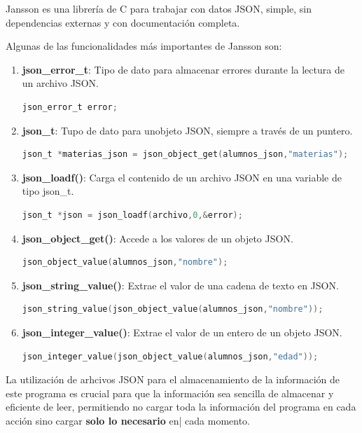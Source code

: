 Jansson es una librería de C para trabajar con datos JSON, simple, sin dependencias externas y con documentación completa.

Algunas de las funcionalidades más importantes de Jansson son:
\begin{enumerate}
    \item \textbf{json\_error\_t}: Tipo de dato para almacenar errores durante la lectura de un archivo JSON.
    \begin{lstlisting}[language=C, caption={json\_error\_t}]
        json_error_t error;
    \end{lstlisting}
    \item \textbf{json\_t}: Tupo de dato para unobjeto JSON, siempre a través de un puntero.
    \begin{lstlisting}[language=C, caption={json\_t}]
        json_t *materias_json = json_object_get(alumnos_json,"materias");
    \end{lstlisting}
    \item \textbf{json\_loadf()}: Carga el contenido de un archivo JSON en una variable de tipo json\_t.
    \begin{lstlisting}[language=C, caption={json\_loadf}]
        json_t *json = json_loadf(archivo,0,&error);
    \end{lstlisting}
    \item \textbf{json\_object\_get()}: Accede a los valores de un objeto JSON.
    \begin{lstlisting}[language=C, caption={json\_object\_get}]
        json_object_value(alumnos_json,"nombre");
    \end{lstlisting}
    \item \textbf{json\_string\_value()}: Extrae el valor de una cadena de texto en JSON.
    \begin{lstlisting}[language=C, caption={json\_string\_value}]
        json_string_value(json_object_value(alumnos_json,"nombre"));
    \end{lstlisting}
    \newpage
    \item \textbf{json\_integer\_value()}: Extrae el valor de un entero de un objeto JSON.
    \begin{lstlisting}[language=C, caption={json\_integer\_value}]
        json_integer_value(json_object_value(alumnos_json,"edad"));
    \end{lstlisting}
\end{enumerate}

La utilización de arhcivos JSON para el almacenamiento de la información de este programa es crucial para que la información sea sencilla de almacenar y eficiente de leer, permitiendo no cargar toda la información del programa en cada acción sino cargar \textbf{solo lo necesario} en| cada momento.